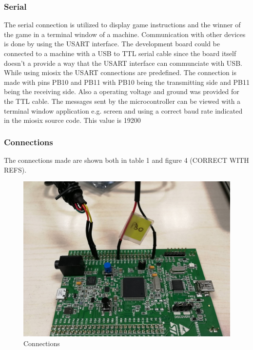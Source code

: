 \subsubsection{Serial}
The serial connection is utilized to display game instructions and the winner of the game in a terminal window of a machine. Communication with other devices is done by using the USART interface. The development board could be connected to a machine with a USB to TTL serial cable since the board itself doesn't a provide a way that the USART interface can communciate with USB. While using miosix the USART connections are predefined. The connection is made with pins PB10 and PB11 with PB10 being the transmitting side and PB11 being the receiving side. Also a operating voltage and ground was provided for the TTL cable. The messages sent by the microcontroller can be viewed with a terminal window application e.g. screen and using a correct baud rate indicated in the miosix source code. This value is 19200 



\subsubsection{Connections}
The connections made are shown both in table 1 and figure 4 (CORRECT WITH REFS). 

\begin{figure}[htbp]
  \centering
     \includegraphics[width=1\textwidth]{./figures/connections.jpg}
  \caption{Connections}
  \label{fig:connections}
\end{figure}

